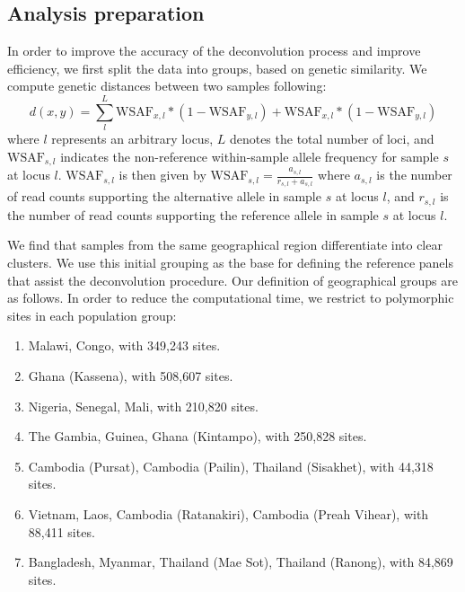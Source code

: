 \documentclass[9pt,lineno]{elife}
\begin{document}
\subsection{Analysis preparation}
In order to improve the accuracy of the deconvolution process and improve efficiency, we first split the  data into groups, based on genetic similarity. We compute genetic distances between two samples following:
\begin{equation}
d(x, y) = \sum_{l}^{L}\textrm{WSAF}_{x,l} * (1-\textrm{WSAF}_{y,l}) + \textrm{WSAF}_{x,l} * (1-\textrm{WSAF}_{y,l})
\end{equation}
where $l$ represents an arbitrary locus, $L$ denotes the total number of loci, and $\textrm{WSAF}_{s,l}$ indicates the non-reference within-sample allele frequency for sample $s$ at locus $l$. $\textrm{WSAF}_{s,l}$ is then given by $\textrm{WSAF}_{s,l} = \frac{a_{s,l}}{r_{s,l}+a_{s,l}}$ where $a_{s,l}$ is the number of read counts supporting the alternative allele in sample $s$ at locus $l$, and $r_{s,l}$ is the number of read counts supporting the reference allele in sample $s$ at locus $l$.

We find that samples from the same geographical region differentiate into clear clusters. We use this initial grouping as the base for defining the reference panels that assist the deconvolution procedure. Our definition of geographical groups are as follows. In order to reduce the computational time, we restrict to polymorphic sites in each population group:
\begin{enumerate}
  \item Malawi, Congo, with 349,243 sites.
  \item Ghana (Kassena), with 508,607 sites.
  \item Nigeria, Senegal, Mali, with 210,820 sites.
  \item The Gambia, Guinea, Ghana (Kintampo), with 250,828 sites.
  \item Cambodia (Pursat), Cambodia (Pailin), Thailand (Sisakhet), with 44,318 sites.
  \item Vietnam, Laos, Cambodia (Ratanakiri), Cambodia (Preah Vihear), with 88,411 sites.
  \item Bangladesh, Myanmar, Thailand (Mae Sot), Thailand (Ranong), with 84,869 sites.
\end{enumerate}


\end{document}
